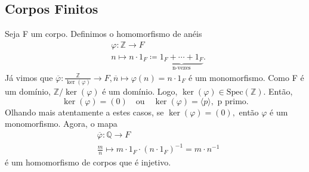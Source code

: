 \documentclass{article}
\begin{document}
\subsection{Corpos Finitos}
Seja F um corpo. Definimos o homomorfismo de anéis
\begin{align*}
  &\varphi :\mathbb{Z}\rightarrow F\\
  &n\mapsto n \cdot 1_{F}\coloneqq \underbrace{1_{F} + \cdots + 1_{F}}_{\text{n-vezes}}.
\end{align*}
Já vimos que \(\overline{\varphi }:\frac{\mathbb{Z}}{\ker{(\varphi )}}\rightarrow F, \overline{n}\mapsto \varphi (n)=n \cdot 1_{F}\) é um monomorfismo. Como F é um
domínio, \(\mathbb{Z}/\ker{(\varphi )}\) é um domínio. Logo, \(\ker{(\varphi )}\in \mathrm{Spec}(\mathbb{Z}).\) Então, 
\[
  \ker{(\varphi )} = (0)\quad\text{ou}\quad \ker{(\varphi )}=\langle p \rangle,\text{ p primo.}
\]
Olhando mais atentamente a estes casos, se \(\ker{(\varphi )} = (0),\) então \(\varphi \) é um monomorfismo. Agora, 
o mapa 
\begin{align*}
   &\overline{\varphi }:\mathbb{Q}\rightarrow F\\
   &\frac{m}{n}\mapsto m \cdot 1_{F} \cdot (n \cdot 1_{F})^{-1} = m \cdot n^{-1}
\end{align*}
é um homomorfismo de corpos que é injetivo.
\end{document}
